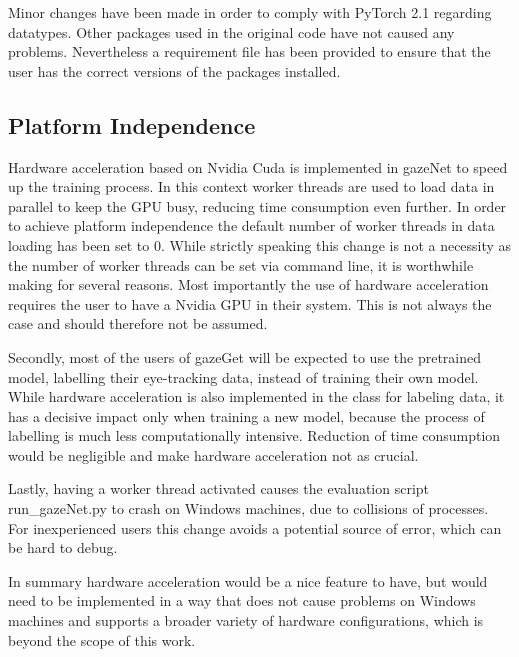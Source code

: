 \documentclass[conference]{IEEEtran}
\begin{document}
Minor changes have been made in order to comply with PyTorch 2.1 regarding datatypes. Other packages used in the original code have not caused any problems. Nevertheless a requirement file has been provided to ensure that the user has the correct versions of the packages installed.


\subsection{Platform Independence}
Hardware acceleration based on Nvidia Cuda is implemented in gazeNet to speed up the training process. In this context worker threads are used to load data in parallel to keep the GPU busy, reducing time consumption even further. In order to achieve platform independence the default number of worker threads in data loading has been set to 0. While strictly speaking this change is not a necessity as the number of worker threads can be set via command line, it is worthwhile making for several reasons. Most importantly the use of hardware acceleration requires the user to have a Nvidia GPU in their system. This is not always the case and should therefore not be assumed.

Secondly, most of the users of gazeGet will be expected to use the pretrained model, labelling their eye-tracking data, instead of training their own model. While hardware acceleration is also implemented in the class for labeling data, it has a decisive impact only when training a new model, because the process of labelling is much less computationally intensive. Reduction of time consumption would be negligible and make hardware acceleration not as crucial.

Lastly, having a worker thread activated causes the evaluation script run\_gazeNet.py to crash on Windows machines, due to collisions of processes. For inexperienced users this change avoids a potential source of error, which can be hard to debug. %

In summary hardware acceleration would be a nice feature to have, but would need to be implemented in a way that does not cause problems on Windows machines and supports a broader variety of hardware configurations, which is beyond the scope of this work.
\end{document}
